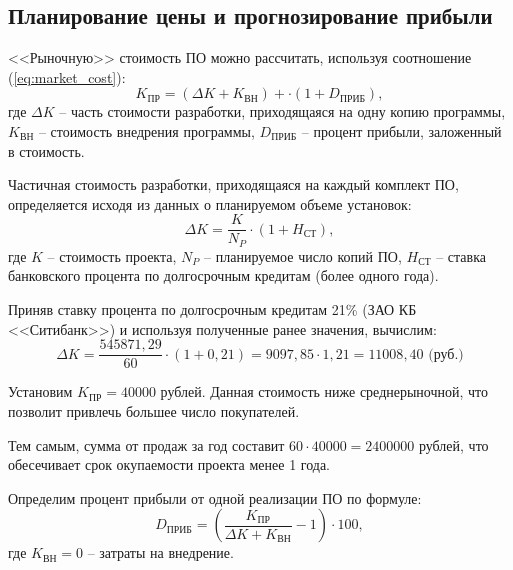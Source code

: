 \subsection{Планирование цены и прогнозирование прибыли} \label{pricing}

<<Рыночную>> стоимость ПО можно рассчитать, используя соотношение (\ref{eq:market_cost}):
\begin{equation}
  \label{eq:market_cost}
K_\textrm{ПР} = (\Delta K + K_\textrm{ВН}) + \cdot (1 + D_\textrm{ПРИБ}),
\end{equation}
где $\Delta K$ -- часть стоимости разработки, приходящаяся на одну копию программы, $K_\textrm{ВН}$ -- стоимость внедрения программы, $D_\textrm{ПРИБ}$ -- процент прибыли, заложенный в стоимость.

Частичная стоимость разработки, приходящаяся на каждый комплект ПО, определяется исходя из данных о планируемом объеме установок:
\begin{equation}
  \label{eq:item_cost}
\Delta K = \frac {K} {N_P} \cdot (1 + H_\textrm{СТ}),
\end{equation}
где $K$ -- стоимость проекта, $N_P$ -- планируемое число копий ПО, $H_\textrm{СТ}$ -- ставка банковского процента по долгосрочным кредитам (более одного года).

Приняв ставку процента по долгосрочным кредитам 21\% (ЗАО КБ <<Ситибанк>>) и используя полученные ранее значения, вычислим:
\begin{equation}
  \label{eq:item_cost_calculate}
\Delta K = \frac {545871,29} {60} \cdot (1 + 0,21) = 9097,85 \cdot 1,21 = 11008,40 \textrm{ (руб.)}
\end{equation}

Установим $K_\textrm{ПР} = 40 000$ рублей. Данная стоимость ниже среднерыночной, что позволит привлечь б\textit{о}льшее число покупателей.

Тем самым, сумма от продаж за год составит $60 \cdot 40 000 = 2400000$ рублей, что обесечивает срок окупаемости проекта менее 1 года.

Определим процент прибыли от одной реализации ПО по формуле:
\begin{equation}
  \label{eq:profit}
D_\textrm{ПРИБ} = (\frac {K_\textrm{ПР}} {\Delta K + K_\textrm{ВН}} - 1) \cdot 100 ,
\end{equation}
где $K_\textrm{ВН} = 0$ -- затраты на внедрение.

